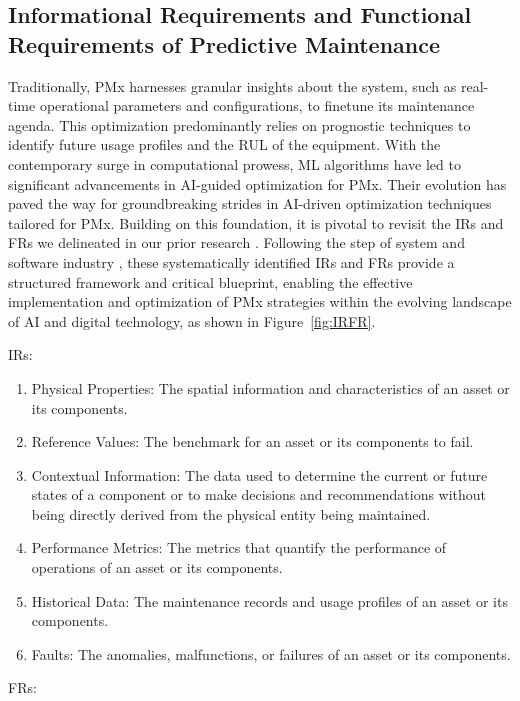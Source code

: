 \documentclass[runningheads]{llncs}
\begin{document}
\subsection{Informational Requirements and Functional Requirements of Predictive Maintenance} \label{subsec:IRFR}
Traditionally, PMx harnesses granular insights about the system, such as real-time operational parameters and configurations, to finetune its maintenance agenda. This optimization predominantly relies on prognostic techniques to identify future usage profiles and the RUL of the equipment. With the contemporary surge in computational prowess, ML algorithms have led to significant advancements in AI-guided optimization for PMx. Their evolution has paved the way for groundbreaking strides in AI-driven optimization techniques tailored for PMx. Building on this foundation, it is pivotal to revisit the IRs and FRs we delineated in our prior research \cite{ma2023twin}. Following the step of system and software industry \cite{sommerville2009deriving, lana2021data}, these systematically identified IRs and FRs provide a structured framework and critical blueprint, enabling the effective implementation and optimization of PMx strategies within the evolving landscape of AI and digital technology, as shown in Figure~\ref{fig:IRFR}.
\newline

IRs:
\begin{enumerate}
    \item Physical Properties: The spatial information and characteristics of an asset or its components.
    \item Reference Values: The benchmark for an asset or its components to fail.
    \item Contextual Information: The data used to determine the current or future states of a component or to make decisions and recommendations without being directly derived from the physical entity being maintained. 
    \item Performance Metrics: The metrics that quantify the performance of operations of an asset or its components.
    \item Historical Data: The maintenance records and usage profiles of an asset or its components.
    \item Faults: The anomalies, malfunctions, or failures of an asset or its components.
\end{enumerate}

FRs:
\end{document}
